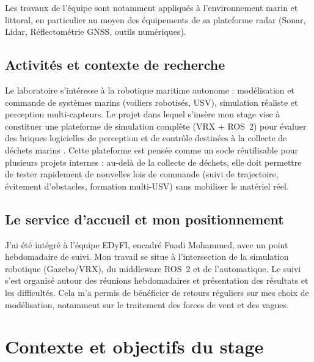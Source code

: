 \documentclass{rapportEILCO}
\begin{document}
	Les travaux de l'équipe sont notamment appliqués à l'environnement marin et littoral, en particulier au moyen des équipements de sa plateforme radar (Sonar, Lidar, Réflectométrie GNSS, outils numériques).
	
	\subsection{Activités et contexte de recherche}
	Le laboratoire s'intéresse à la robotique maritime autonome : modélisation et commande de systèmes marins (voiliers robotisés, USV), simulation réaliste et perception multi-capteurs. Le projet dans lequel s'insère mon stage vise à constituer une plateforme de simulation complète (VRX + ROS~2) pour évaluer des briques logicielles de perception et de contrôle destinées à la collecte de déchets marins \cite{atron}. Cette plateforme est pensée comme un socle réutilisable pour plusieurs projets internes : au-delà de la collecte de déchets, elle doit permettre de tester rapidement de nouvelles lois de commande (suivi de trajectoire, évitement d'obstacles, formation multi-USV) sans mobiliser le matériel réel.
	
	\subsection{Le service d'accueil et mon positionnement}
	J'ai été intégré à l'équipe EDyFI, encadré Fnadi Mohammed, avec un point hebdomadaire de suivi. Mon travail se situe à l'intersection de la simulation robotique (Gazebo/VRX), du middleware ROS~2 et de l'automatique. Le suivi s'est organisé autour des réunions hebdomadaires et présentation des résultats et les difficultés. Cela m'a permis de bénéficier de retours réguliers sur mes choix de modélisation, notamment sur le traitement des forces de vent et des vagues.
	
	\section{Contexte et objectifs du stage}
	
\end{document}
